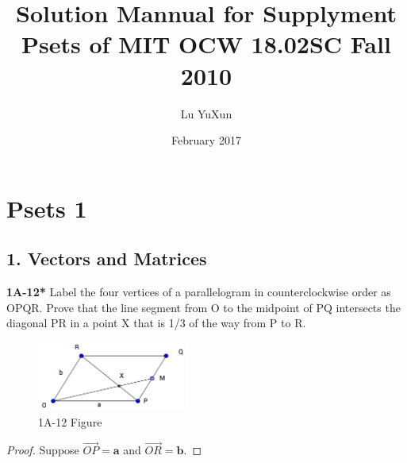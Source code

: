 \documentclass{article}
\title{Solution Mannual for Supplyment Psets of MIT OCW 18.02SC Fall 2010}
\author{Lu YuXun}
\date{February 2017}
\begin{document}
\maketitle

\section{Psets 1}
\subsection{1. Vectors and Matrices}
\textbf{1A-12*} Label the four vertices of a parallelogram in counterclockwise order as OPQR. Prove that the line segment from O to the midpoint of PQ intersects the diagonal PR in a point X that is 1/3 of the way from P to R.
\begin{figure}[htp!]
    \centering
    \includegraphics[width=50mm,scale=0.5]{Figure/1A-12.png}
    \caption{1A-12 Figure}
    \label{1A-12 Figure}
\end{figure}
\begin{proof}
Suppose $\vec{OP} = \mathbf{a}$ and $\vec{OR} = \mathbf{b}$.
\end{proof}
\end{document}

